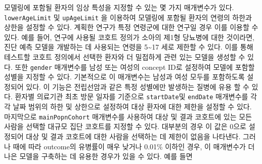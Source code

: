 \documentclass[10.5pt]{book}
\theoremstyle{definition}
\theoremstyle{definition}
\theoremstyle{definition}
\theoremstyle{remark}
\begin{document}
모델링에 포함될 환자의 임상 특성을 지정할 수 있는 몇 가지 매개변수가
있다. \texttt{lowerAgeLimit} 및 \texttt{upAgeLimit} 을 이용하여 모델링에
포함될 환자의 연령의 하한과 상한을 설정할 수 있다. 계획한 연구가 특정
연령군에 대한 연구일 경우 이를 이용할 수 있다. 예를 들어, 연구에 사용될
코호트 정의가 소아의 제1형 당뇨병에 대한 것이라면, 진단 예측 모델을
개발하는 데 사용되는 연령을 5\textasciitilde{}17 세로 제한할 수 있다.
이를 통해 테스트할 코호트 정의에서 선택한 환자와 더 밀접하게 관련 있는
모델을 생성할 수 있다. 또한 \texttt{gender} 매개변수를 남성 또는 여성의
concept ID로 설정하여 모델에 포함할 성별을 지정할 수 있다. 기본적으로 이
매개변수는 남성과 여성 모두를 포함하도록 설정되어 있다. 이 기능은
전립선암과 같은 특정 성별에만 발생하는 질병에 유용 할 수 있다. 환자별
의료기관 최초 방문 일자를 기준으로 \texttt{startDate}및 \texttt{endDate}
매개변수를 각각 날짜 범위의 하한 및 상한으로 설정하여 대상 환자에 대한
제한을 설정할 수 있다. 마지막으로 \texttt{mainPopnCohort} 매개변수를
사용하여 대상 및 결과 코호트에 있는 모든 사람을 선택할 대규모 집단
코호트를 지정할 수 있다. 대부분의 경우 이 값은 0으로 설정되어 대상 및
결과 코호트에 대한 사람을 선택하는 데 제한이 없음을 나타낸다. 그러나
때에 따라 outcome의 유병률이 매우 낮거나 0.01\% 이하인 경우, 이
매개변수가 더 나은 모델을 구축하는 데 유용한 경우가 있을 수 있다. 예를
들면
\end{document}
